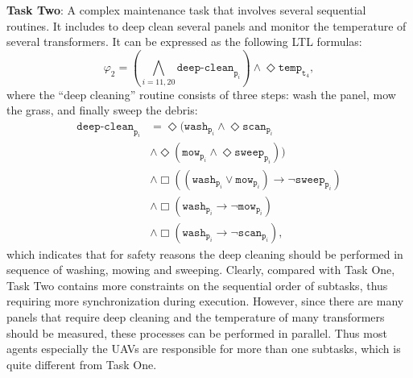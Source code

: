 \textbf{Task Two}: A complex maintenance task that involves several
sequential routines.
It includes to deep clean several panels and monitor
the temperature of several transformers.
It can be expressed as the following LTL formulas:
\begin{equation}\label{eq:task2}
    \varphi_2 = (\bigwedge_{i=11,20}
    \texttt{deep-clean}_{\texttt{p}_i} ) \wedge  \Diamond
    \texttt{temp}_{\texttt{t}_4},
\end{equation}
where the ``deep cleaning'' routine consists of three steps:
wash the panel,  mow the grass, and finally sweep the debris:
\begin{equation*}
  \begin{aligned}
    \texttt{deep-clean}_{\texttt{p}_i} &= \Diamond (
    \texttt{wash}_{\texttt{p}_i} \wedge\Diamond \texttt{scan}_{\texttt{p}_i} \\
    & \wedge \Diamond
    \left(\texttt{mow}_{\texttt{p}_i} \wedge
    \Diamond \texttt{sweep}_{\texttt{p}_i} \right))\\
    & \wedge \Box \left((\texttt{wash}_{\texttt{p}_i} \lor \texttt{mow}_{\texttt{p}_i})
    \rightarrow \lnot \texttt{sweep}_{\texttt{p}_i} \right)\\
    & \wedge \Box \left( \texttt{wash}_{\texttt{p}_i} \rightarrow
    \lnot \texttt{mow}_{\texttt{p}_i} \right)\\
    &\wedge \Box \left( \texttt{wash}_{\texttt{p}_i} \rightarrow
    \lnot \texttt{scan}_{\texttt{p}_i} \right),
  \end{aligned}
\end{equation*}
which indicates that for safety reasons the deep cleaning should be performed
in sequence of washing, mowing and sweeping.
Clearly, compared with Task One, Task Two contains more constraints on the
sequential order of subtasks, thus requiring more synchronization during
execution.
However, since there are many panels that require deep cleaning
and the temperature of many transformers should be measured,
these processes can be performed in parallel.
Thus most agents especially the UAVs are responsible for more than one subtasks,
which is quite different from Task One.


